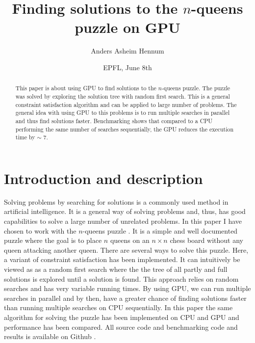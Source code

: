 \documentclass{article}
\title{Finding solutions to the $n$-queens puzzle on GPU}
\author{Anders Asheim Hennum}
\date{EPFL, June 8th}
\begin{document}
\maketitle

\begin{abstract}
This paper is about using GPU to find solutions to the $n$-queens puzzle. The puzzle was
solved by exploring the solution tree with random first search. This is a general constraint
satisfaction algorithm and can be applied to large number of problems. The general idea with using GPU to
this problems is to run multiple searches in parallel and thus find solutions faster. Benchmarking shows that compared to a CPU performing
the same number of searches sequentially, the GPU reduces the execution time by $\sim$ 7.

\end{abstract}

\section{Introduction and description}

Solving problems by searching for solutions is a commonly used method in artificial intelligence. 
It is a general way of solving problems and, thus, has good capabilities to solve a large number of unrelated problems. 
In this paper I have chosen to work with the $n$-queens puzzle \cite{nqueen}. 
It is a simple and well documented puzzle where the goal is to place $n$ queens on an $n \times n$ chess
board without any queen attacking another queen. There are several ways to solve this puzzle. Here, a variant 
of constraint satisfaction \cite{constraint} has been implemented. It can intuitively be viewed as as a random first search where
the the tree of all partly and full solutions is explored until a solution is found.  
This approach relies on random searches and has very variable running times.
By using GPU, we can run multiple searches in parallel and by then, have a greater chance of finding
solutions faster than running multiple searches on CPU sequentially. In this paper the same algorithm for solving the 
puzzle has been implemented on CPU and GPU and performance has been compared. All source code and benchmarking code and results
is available on Github \cite{github}.
\end{document}
